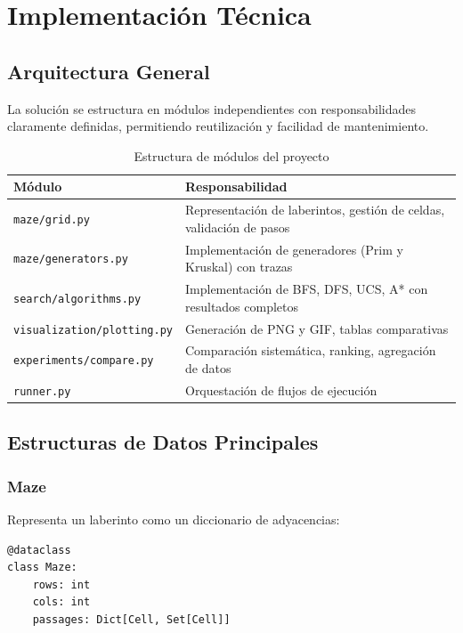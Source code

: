 \documentclass[12pt,a4paper]{article}
\begin{document}
\section{Implementación Técnica}

\subsection{Arquitectura General}

La solución se estructura en módulos independientes con responsabilidades claramente definidas, permitiendo reutilización y facilidad de mantenimiento.

\begin{table}[H]
\centering
\caption{Estructura de módulos del proyecto}
\begin{tabular}{|l|p{7cm}|}
\hline
\textbf{Módulo} & \textbf{Responsabilidad} \\
\hline
\texttt{maze/grid.py} & Representación de laberintos, gestión de celdas, validación de pasos \\
\hline
\texttt{maze/generators.py} & Implementación de generadores (Prim y Kruskal) con trazas \\
\hline
\texttt{search/algorithms.py} & Implementación de BFS, DFS, UCS, A* con resultados completos \\
\hline
\texttt{visualization/plotting.py} & Generación de PNG y GIF, tablas comparativas \\
\hline
\texttt{experiments/compare.py} & Comparación sistemática, ranking, agregación de datos \\
\hline
\texttt{runner.py} & Orquestación de flujos de ejecución \\
\hline
\end{tabular}
\end{table}

\subsection{Estructuras de Datos Principales}

\subsubsection{Maze}

Representa un laberinto como un diccionario de adyacencias:

\begin{lstlisting}
@dataclass
class Maze:
    rows: int
    cols: int
    passages: Dict[Cell, Set[Cell]]
\end{lstlisting}
\end{document}
